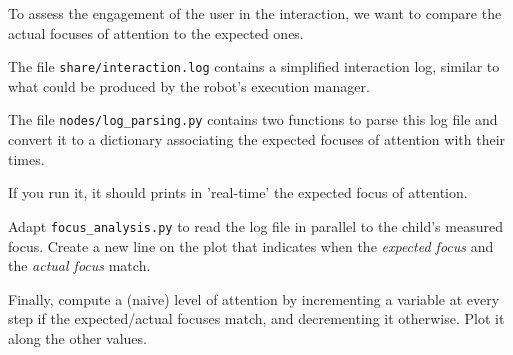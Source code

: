 \documentclass{instructions}
\begin{document}
To assess the engagement of the user in the interaction, we want to compare the
actual focuses of attention to the expected ones.

The file {\tt share/interaction.log} contains a simplified interaction log,
similar to what could be produced by the robot's execution manager.

The file {\tt nodes/log\_parsing.py} contains two functions to parse this log
file and convert it to a dictionary associating the expected focuses of
attention with their times.

If you run it, it should prints in 'real-time' the expected focus of attention.


Adapt {\tt focus\_analysis.py} to read the log file in parallel to the child's measured
focus. Create a new line on the plot that indicates when the \emph{expected
focus} and the \emph{actual focus} match.
%
%

Finally, compute a (naive) level of attention by incrementing a variable at
every step if the expected/actual focuses match, and decrementing it otherwise.
Plot it along the other values.




\end{document}
